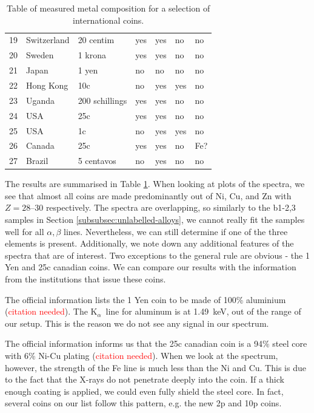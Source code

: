 \documentclass[11pt,a4paper,twoside,onecolumn]{article}
\newcommand{\reminder}[1]{\textcolor{red}{#1}}
\newcommand{\Kalpha}{$\mathrm{K}_\alpha$~}
\begin{document}
\begin{table}[!htbp]
\begin{tabular}{@{}lllllll@{}}
    19 & Switzerland    & 20 centim      & yes & yes & no  & no    \\
    20 & Sweden         & 1 krona        & yes & yes & no  & no    \\
    21 & Japan          & 1 yen          & no  & no  & no  & no    \\
    22 & Hong Kong      & 10c            & no  & yes & yes & no    \\
    23 & Uganda         & 200 schillings & yes & yes & no  & no    \\
    24 & USA            & 25c            & yes & yes & no  & no    \\
    25 & USA            & 1c             & no  & yes & yes & no    \\
    26 & Canada         & 25c            & yes & yes & no  & Fe?   \\
    27 & Brazil         & 5 centavos     & no  & yes & no  & no    \\ \bottomrule
    \end{tabular}
    \caption{Table of measured metal composition for a selection of international coins.}
    \label{tab:coin-measured}
\end{table}

The results are summarised in Table \ref{tab:coin-measured}. When looking at plots of the spectra, we see that almost all coins are made predominantly out of Ni, Cu, and Zn with $Z=\numrange{28}{30}$ respectively. The spectra are overlapping, so similarly to the b1-2,3 samples in Section \ref{subsubsec:unlabelled-alloys}, we cannot really fit the samples well for all $\alpha, \beta$ lines. Nevertheless, we can still determine if one of the three elements is present. Additionally, we note down any additional features of the spectra that are of interest. Two exceptions to the general rule are obvious - the 1 Yen and 25c canadian coins. We can compare our results with the information from the institutions that issue these coins.

The official information lists the 1 Yen coin to be made of 100\% aluminium (\reminder{citation needed}). The \Kalpha line for aluminum is at \qty{1.49}{keV}, out of the range of our setup. This is the reason we do not see any signal in our spectrum.

The official information informs us that the 25c canadian coin is a 94\% steel core with 6\% Ni-Cu plating (\reminder{citation needed}). When we look at the spectrum, however, the strength of the Fe line is much less than the Ni and Cu. This is due to the fact that the X-rays do not penetrate deeply into the coin. If a thick enough coating is applied, we could even fully shield the steel core. In fact, several coins on our list follow this pattern, e.g. the new 2p and 10p coins.
\end{document}
